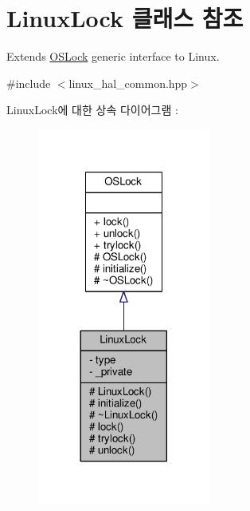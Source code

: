 \hypertarget{class_linux_lock}{}\section{Linux\+Lock 클래스 참조}
\label{class_linux_lock}


Extends \hyperlink{class_o_s_lock}{O\+S\+Lock} generic interface to Linux.  




{\ttfamily \#include $<$linux\+\_\+hal\+\_\+common.\+hpp$>$}



Linux\+Lock에 대한 상속 다이어그램 \+: 
\nopagebreak
\begin{figure}[H]
\begin{center}
\leavevmode
\includegraphics[width=161pt]{class_linux_lock__inherit__graph}
\end{center}
\end{figure}



